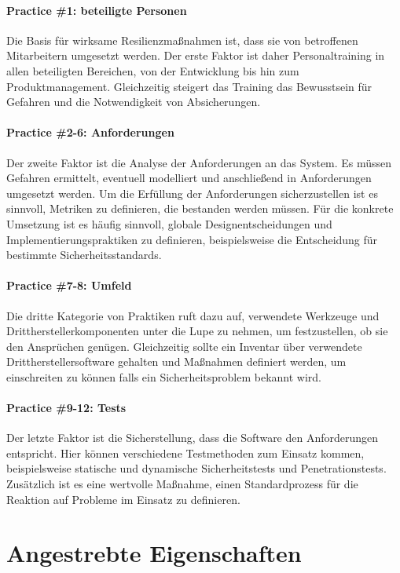 \documentclass[]{lni}
\begin{document}
\paragraph{Practice \#1: beteiligte Personen}
Die Basis für wirksame Resilienzmaßnahmen ist, dass sie von betroffenen Mitarbeitern umgesetzt werden. Der erste Faktor ist daher Personaltraining in allen beteiligten Bereichen, von der Entwicklung bis hin zum Produktmanagement. Gleichzeitig steigert das Training das Bewusstsein für Gefahren und die Notwendigkeit von Absicherungen.

\paragraph{Practice \#2-6: Anforderungen}
Der zweite Faktor ist die Analyse der Anforderungen an das System. Es müssen Gefahren ermittelt, eventuell modelliert und anschließend in Anforderungen umgesetzt werden. Um die Erfüllung der Anforderungen sicherzustellen ist es sinnvoll, Metriken zu definieren, die bestanden werden müssen. Für die konkrete Umsetzung ist es häufig sinnvoll, globale Designentscheidungen und Implementierungspraktiken zu definieren, beispielsweise die Entscheidung für bestimmte Sicherheitsstandards.

\paragraph{Practice \#7-8: Umfeld}
Die dritte Kategorie von Praktiken ruft dazu auf, verwendete Werkzeuge und Drittherstellerkomponenten unter die Lupe zu nehmen, um festzustellen, ob sie den Ansprüchen genügen. Gleichzeitig sollte ein Inventar über verwendete Drittherstellersoftware gehalten und Maßnahmen definiert werden, um einschreiten zu können falls ein Sicherheitsproblem bekannt wird.

\paragraph{Practice \#9-12: Tests}
Der letzte Faktor ist die Sicherstellung, dass die Software den Anforderungen entspricht. Hier können verschiedene Testmethoden zum Einsatz kommen, beispielsweise statische und dynamische Sicherheitstests und Penetrationstests. Zusätzlich ist es eine wertvolle Maßnahme, einen Standardprozess für die Reaktion auf Probleme im Einsatz zu definieren.



\section*{Angestrebte Eigenschaften} \label{design-properties}
\end{document}
